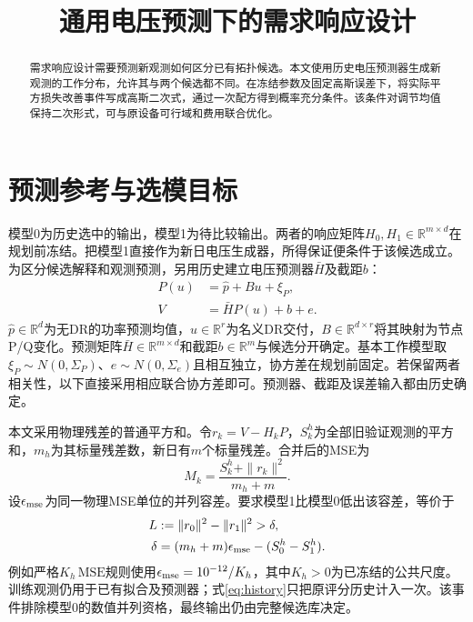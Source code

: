 \documentclass[journal,10pt]{IEEEtran}
\newcommand{\R}{\mathbb R}
\begin{document}
\title{通用电压预测下的需求响应设计}
\author{}
\maketitle
\begin{abstract}
需求响应设计需要预测新观测如何区分已有拓扑候选。本文使用历史电压预测器生成新观测的工作分布，允许其与两个候选都不同。在冻结参数及固定高斯误差下，将实际平方损失改善事件写成高斯二次式，通过一次配方得到概率充分条件。该条件对调节均值保持二次形式，可与原设备可行域和费用联合优化。
\end{abstract}

\section{预测参考与选模目标}
模型0为历史选中的输出，模型1为待比较输出。两者的响应矩阵$H_0,H_1\in\R^{m\times d}$在规划前冻结。把模型1直接作为新日电压生成器，所得保证便条件于该候选成立。为区分候选解释和观测预测，另用历史建立电压预测器$\bar H$及截距$b$：
\begin{align}
P(u)&=\widehat p+Bu+\xi_P, \label{eq:power}\\
V&=\bar H P(u)+b+e. \label{eq:reference}
\end{align}
$\widehat p\in\R^d$为无DR的功率预测均值，$u\in\R^r$为名义DR交付，$B\in\R^{d\times r}$将其映射为节点P/Q变化。预测矩阵$\bar H\in\R^{m\times d}$和截距$b\in\R^m$与候选分开确定。基本工作模型取$\xi_P\sim N(0,\Sigma_P)$、$e\sim N(0,\Sigma_e)$且相互独立，协方差在规划前固定。若保留两者相关性，以下直接采用相应联合协方差即可。预测器、截距及误差输入都由历史确定。

本文采用物理残差的普通平方和。令$r_k=V-H_kP$，$S_k^h$为全部旧验证观测的平方和，$m_h$为其标量残差数，新日有$m$个标量残差。合并后的MSE为
\begin{equation}
M_k=\frac{S_k^h+\|r_k\|^2}{m_h+m}. \label{eq:mse}
\end{equation}
设$\epsilon_{\rm mse}$为同一物理MSE单位的并列容差。要求模型1比模型0低出该容差，等价于
\begin{align}
L&:=\|r_0\|^2-\|r_1\|^2>\delta, \label{eq:loss}\\
\delta&=(m_h+m)\epsilon_{\rm mse}-(S_0^h-S_1^h). \label{eq:history}
\end{align}
例如严格$K_h\,\mathrm{MSE}$规则使用$\epsilon_{\rm mse}=10^{-12}/K_h$，其中$K_h>0$为已冻结的公共尺度。训练观测仍用于已有拟合及预测器；式\eqref{eq:history}只把原评分历史计入一次。该事件排除模型0的数值并列资格，最终输出仍由完整候选库决定。
\end{document}
